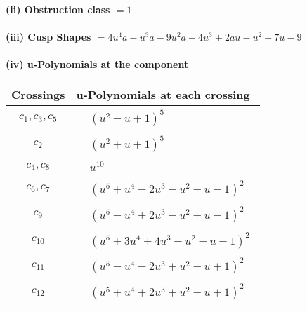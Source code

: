 \documentclass[1p]{elsarticle_modified}
\theoremstyle{definition}
\begin{document}
\flushleft \textbf{(ii) Obstruction class $= 1$}\\~\\
\flushleft \textbf{(iii) Cusp Shapes $= 4 u^4 a- u^3 a-9 u^2 a-4 u^3+2 a u- u^2+7 u-9$}\\~\\
\newpage\renewcommand{\arraystretch}{1}
\flushleft \textbf{(iv) u-Polynomials at the component}\newline \\
\begin{tabular}{m{50pt}|m{274pt}}
Crossings & \hspace{64pt}u-Polynomials at each crossing \\
\hline $$\begin{aligned}c_{1},c_{3},c_{5}\end{aligned}$$&$\begin{aligned}
&(u^2- u+1)^5
\end{aligned}$\\
\hline $$\begin{aligned}c_{2}\end{aligned}$$&$\begin{aligned}
&(u^2+u+1)^5
\end{aligned}$\\
\hline $$\begin{aligned}c_{4},c_{8}\end{aligned}$$&$\begin{aligned}
&u^{10}
\end{aligned}$\\
\hline $$\begin{aligned}c_{6},c_{7}\end{aligned}$$&$\begin{aligned}
&(u^5+u^4-2 u^3- u^2+u-1)^2
\end{aligned}$\\
\hline $$\begin{aligned}c_{9}\end{aligned}$$&$\begin{aligned}
&(u^5- u^4+2 u^3- u^2+u-1)^2
\end{aligned}$\\
\hline $$\begin{aligned}c_{10}\end{aligned}$$&$\begin{aligned}
&(u^5+3 u^4+4 u^3+u^2- u-1)^2
\end{aligned}$\\
\hline $$\begin{aligned}c_{11}\end{aligned}$$&$\begin{aligned}
&(u^5- u^4-2 u^3+u^2+u+1)^2
\end{aligned}$\\
\hline $$\begin{aligned}c_{12}\end{aligned}$$&$\begin{aligned}
&(u^5+u^4+2 u^3+u^2+u+1)^2
\end{aligned}$\\
\hline
\end{tabular}\\~\\
\end{document}
